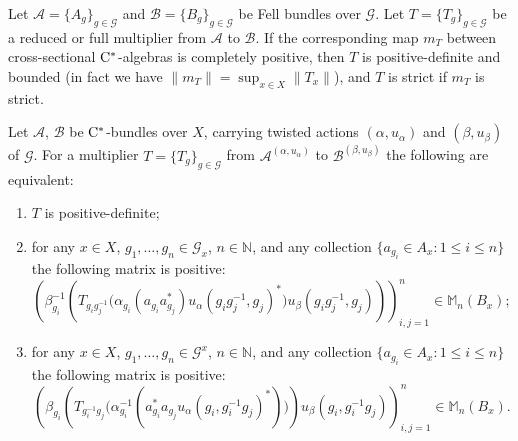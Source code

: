 \documentclass[10pt,a4paper]{amsart}
\newcommand{\A}{\mathcal A}
\newcommand{\B}{\mathcal B}
\newcommand{\G}{\mathcal G} %
\newcommand{\Mat}{\mathbb M} %
\newcommand{\N}{\mathbb N}
\newcommand{\cst}{\ifmmode\mathrm{C}^*\else{$\mathrm{C}^*$}\fi}
\newcommand{\m}{m}
\begin{document}
\begin{lem}\label{lem:completely_positive_implies_positive_definite}
Let $\A = \{ A_g \}_{g \in \G}$ and $\B = \{ B_g \}_{g \in \G}$ be Fell bundles over $\G$. 
Let $T = \{ T_g \}_{g\in \G}$ be a reduced or full multiplier from $\A$ to $\B$. 
If the corresponding map $\m_T$ between cross-sectional $\cst$-algebras is completely positive, then $T$ is positive-definite and bounded (in fact we have $\|\m_T\|=\sup_{x\in X}\|T_x\|$), and $T$ is strict if $\m_T$ is strict.
\end{lem}

\begin{lem}\label{lem:positive_action}
Let $\A$, $\B$ be $\cst$-bundles over $X$, carrying twisted actions $(\alpha,u_\alpha)$ and $(\beta,u_\beta)$ of $\G$.
For a  multiplier $T=\{T_g\}_{g\in \G}$ from $\A^{(\alpha,u_{\alpha})}$ to $\B^{(\beta,u_{\beta})}$ the following are equivalent:
\begin{enumerate}
    \item\label{enu:positive_action1} $T$ is positive-definite;
    \item\label{enu:positive_action2} for any $x \in X$, $g_1 , \ldots , g_n \in \G_x$, $n \in \N$, and any collection $\{ a_{g_i} \in A_x : 1 \leq i \leq n \}$ the following matrix is positive: 
	\[
	   \left( \beta_{g_i}^{-1} \left(T_{g_i g_j^{-1}} \big( \alpha_{g_i}(a_{g_i} a_{g_j}^*) u_{\alpha}(g_i g_j^{-1} , g_j)^* \big) u_{\beta}(g_i g_j^{-1} , g_j) \right) \right)_{i,j = 1}^n \in \Mat_{n}(B_x);
	\]
	\item\label{enu:positive_action3} for any $x \in X$, $g_1 , \ldots , g_n \in \G^x$, $n \in \N$, and any collection $\{ a_{g_i} \in A_x : 1 \leq i \leq n \}$ the following matrix is positive: 
	\[
	   \left( \beta_{g_i} \left(T_{g_i^{-1} g_j} \big( \alpha_{g_i}^{-1}(a_{g_i}^* a_{g_j} u_{\alpha}(g_i , g_i^{-1} g_j)^*) \big) \right) u_{\beta}(g_i , g_i^{-1} g_j) \right)_{i,j = 1}^n \in \Mat_{n}(B_x). 
	\]
	\end{enumerate}
\end{lem}
\end{document}
